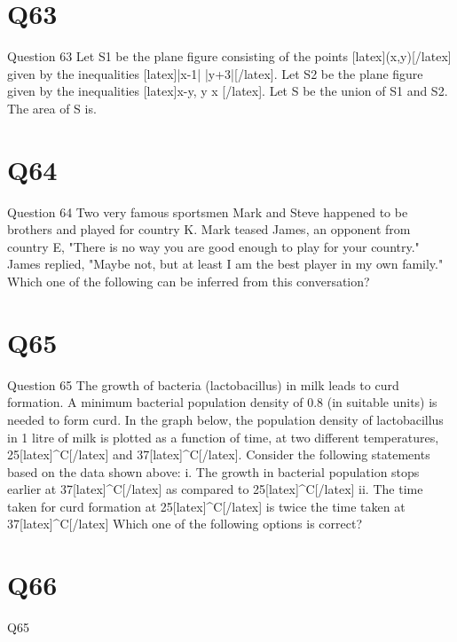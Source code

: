 \section*{Q63}
Question 63 Let S1 be the plane figure consisting of the points [latex](x,y)[/latex] given by the inequalities [latex]|x-1|  |y+3|[/latex]. Let S2 be the plane figure given by the inequalities [latex]x-y, y  x [/latex]. Let S be the union of S1 and S2. The area of S is.

\section*{Q64}
Question 64 Two very famous sportsmen Mark and Steve happened to be brothers and played for country K. Mark teased James, an opponent from country E, "There is no way you are good enough to play for your country." James replied, "Maybe not, but at least I am the best player in my own family." Which one of the following can be inferred from this conversation?

\section*{Q65}
Question 65 The growth of bacteria (lactobacillus) in milk leads to curd formation. A minimum bacterial population density of 0.8 (in suitable units) is needed to form curd. In the graph below, the population density of lactobacillus in 1 litre of milk is plotted as a function of time, at two different temperatures, 25[latex]^{\circ}C[/latex] and 37[latex]^{\circ}C[/latex]. Consider the following statements based on the data shown above: i.  The growth in bacterial population stops earlier at 37[latex]^{\circ}C[/latex] as compared to 25[latex]^{\circ}C[/latex] ii.  The time taken for curd formation at 25[latex]^{\circ}C[/latex] is twice the time taken at 37[latex]^{\circ}C[/latex] Which one of the following options is correct?

\section*{Q66}
Q65
